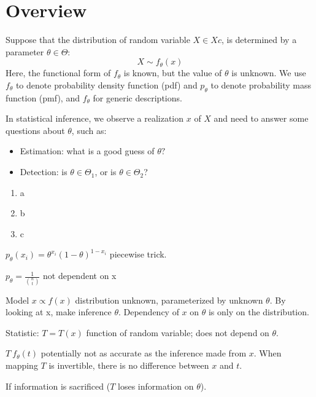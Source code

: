 \chapter{Overview}

Suppose that the distribution of random variable $X \in Xc$, is determined by a parameter $\theta \in \Theta$:
\[
    X \sim f_\theta(x)
\]
Here, the functional form of $f_\theta$ is known, but the value of $\theta$ is unknown. We use $f_\theta$ to denote probability density function (pdf) and $p_\theta$ to denote probability mass function (pmf), and $f_\theta$ for generic descriptions.

In statistical inference, we observe a realization $x$ of $X$ and need to answer some questions about $\theta$, such as:
\begin{itemize}
    \setlength\itemsep{-2.5pt}
    \item Estimation: what is a good guess of $\theta?$
    \item Detection: is $\theta \in \Theta_1$, or is $\theta \in \Theta_2$?
\end{itemize}

\begin{enumerate}[label=\textbf{--}, topsep=5pt, itemsep=5pt]
    \item a
    \item b
    \item c
\end{enumerate}

$p_\theta (x_i) = \theta^{x_i} (1-\theta)^{1- x_i}$ piecewise trick.

$p_\theta = \frac{1}{{n \choose t}}$ not dependent on x


Model $x \propto f(x)$ distribution unknown, parameterized by unknown $\theta$.
By looking at x, make inference $\theta$. Dependency of $x$ on $\theta$ is only on the distribution.

Statistic: $T = T(x)$ function of random variable; does not depend on $\theta$.

$ T ~ f_\theta(t)$ potentially not as accurate as the inference made from $x$.
When mapping $T$ is invertible, there is no difference between $x$ and $t$.

If information is sacrificed ($T$ loses information on $\theta$).